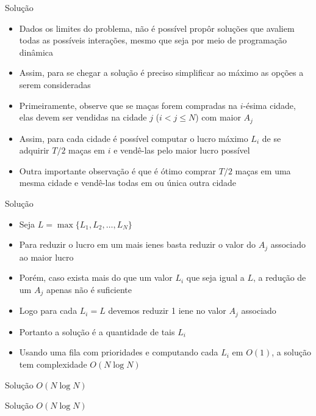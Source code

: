 \begin{frame}[fragile]{Solução}

    \begin{itemize}
        \item Dados os limites do problema, não é possível propôr soluções que avaliem todas
            as possíveis interações, mesmo que seja por meio de programação dinâmica

        \item Assim, para se chegar a solução é preciso simplificar ao máximo as opções a 
            serem consideradas

        \item Primeiramente, observe que se maças forem compradas na $i$-ésima cidade, elas
            devem ser vendidas na cidade $j$ ($i < j \leq N$) com maior $A_j$

        \item Assim, para cada cidade é possível computar o lucro máximo $L_i$ de se adquirir
            $T/2$ maças em $i$ e vendê-las pelo maior lucro possível

        \item Outra importante observação é que é ótimo comprar $T/2$ maças em uma mesma cidade
            e vendê-las todas em ou única outra cidade

    \end{itemize}

\end{frame}


\begin{frame}[fragile]{Solução}

    \begin{itemize}
        \item Seja $L = \max\{ L_1, L_2, \ldots, L_N \}$

        \item Para reduzir o lucro em um mais ienes basta reduzir o valor do $A_j$ associado
            ao maior lucro

        \item Porém, caso exista mais do que um valor $L_i$ que seja igual a $L$, a redução de
            um $A_j$ apenas não é suficiente

        \item Logo para cada $L_i = L$ devemos reduzir 1 iene no valor $A_j$ associado

        \item Portanto a solução é a quantidade de tais $L_i$

        \item Usando uma fila com prioridades e computando cada $L_i$ em $O(1)$, a solução
            tem complexidade $O(N\log N)$
    \end{itemize}

\end{frame}

\begin{frame}[fragile]{Solução $O(N\log N)$}
\end{frame}

\begin{frame}[fragile]{Solução $O(N\log N)$}
\end{frame}
